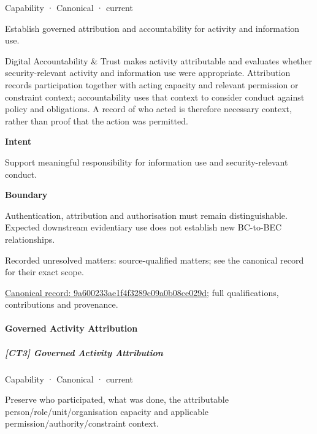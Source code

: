 \label{element:9a600233ae1f4f3289c09a0b08ce029d}
{\small Capability · Canonical · current}\par

Establish governed attribution and accountability for activity and information use.



Digital Accountability \& Trust makes activity attributable and evaluates whether security-relevant activity and information use were appropriate. Attribution records participation together with acting capacity and relevant permission or constraint context; accountability uses that context to consider conduct against policy and obligations. A record of who acted is therefore necessary context, rather than proof that the action was permitted.



\textbf{Intent}



Support meaningful responsibility for information use and security-relevant conduct.



\textbf{Boundary}



Authentication, attribution and authorisation must remain distinguishable. Expected downstream evidentiary use does not establish new BC-to-BEC relationships.


{\small Recorded unresolved matters: source-qualified matters; see the canonical record for their exact scope.}\par
{\footnotesize \href{../../../../continuum/strategy/capability/9a600233ae1f4f3289c09a0b08ce029d.md}{Canonical record: 9a600233ae1f4f3289c09a0b08ce029d}; full qualifications, contributions and provenance.}\par
\paragraph{Governed Activity Attribution}

\subparagraph{[CT3] Governed Activity Attribution}

\label{element:646b3fd80a8b4f269691db7942e0f809}
{\small Capability · Canonical · current}\par

Preserve who participated, what was done, the attributable person/role/unit/organisation capacity and applicable permission/authority/constraint context.




